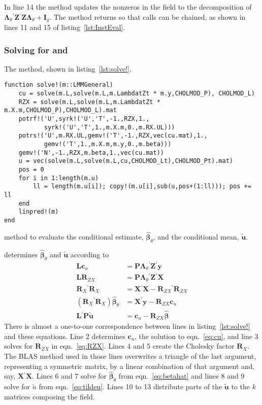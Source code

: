 \documentclass{jss}
\newcommand{\bLt}{\ensuremath{\bm\Lambda_\theta}}
\newcommand{\trans}{\ensuremath{^\prime}}
\begin{document}
In line 14 the  method updates the nonzeros in the
 field to the decomposition of $\bLt\trans\bm Z\trans\bm
Z\bLt+\bm I_q$.  The method returns  so that calls can be
chained, as shown in lines 11 and 15 of listing~\ref{lst:InstEval}.

\subsubsection{Solving for  and }
\label{sec:betasolve}

The  method, shown in listing~\ref{lst:solve!},
\begin{listing}[tbp]
  \begin{verbatim}
function solve!(m::LMMGeneral)
    cu = solve(m.L,solve(m.L,m.LambdatZt * m.y,CHOLMOD_P), CHOLMOD_L)
    RZX = solve(m.L,solve(m.L,m.LambdatZt * m.X.m,CHOLMOD_P),CHOLMOD_L).mat
    potrf!('U',syrk!('U','T',-1.,RZX,1.,
           syrk!('U','T',1.,m.X.m,0.,m.RX.UL)))
    potrs!('U',m.RX.UL,gemv!('T',-1.,RZX,vec(cu.mat),1.,
           gemv!('T',1.,m.X.m,m.y,0.,m.beta)))
    gemv!('N',-1.,RZX,m.beta,1.,vec(cu.mat))
    u = vec(solve(m.L,solve(m.L,cu,CHOLMOD_Lt),CHOLMOD_Pt).mat)
    pos = 0
    for i in 1:length(m.u)
        ll = length(m.u[i]); copy!(m.u[i],sub(u,pos+(1:ll))); pos += ll
    end
    linpred!(m)
end
  \end{verbatim}
  \caption{ method to evaluate the conditional estimate,
    $\widehat{\bm\beta}_\theta$, and the conditional mean, $\tilde{\bm
      u}$.}
  \label{lst:solve!}
\end{listing}
determines $\widehat{\bm\beta}_\theta$ and $\tilde{\bm u}$ according
to
\begin{align}
    \bm L\bm c_u&=\bm P\bLt\trans\bm Z\trans\bm y\label{eq:cu}\\
    \bm L\bm R_{ZX}&=\bm P\bLt\trans\bm Z\trans\bm X\label{eq:RZX}\\
    \bm R_X\trans\bm R_X&=\bm X\trans\bm X-\bm R_{ZX}\trans\bm R_{ZX}\label{eq:RX}\\
    \left(\bm R_X\trans\bm R_X\right)\widehat{\bm\beta}_\theta&=
      \bm X\trans\bm y-\bm R_{ZX}\bm c_u\label{eq:betahat}\\
    \bm L\trans\bm P\tilde{\bm u}&=\bm c_u-\bm R_{ZX}\widehat{\bm\beta}\label{eq:tildeu}
\end{align}
There is almost a one-to-one correspondence between lines in
listing~\ref{lst:solve!} and these equations.  Line 2 determines $\bm
c_u$, the solution to eqn.~\ref{eq:cu}, and line 3 solves for $\bm R_{ZX}$ in
eqn.~\ref{eq:RZX}.  Lines 4 and 5 create the Cholesky factor $\bm
R_X$.  The BLAS method  used in those lines overwrites a
triangle of the last argument, representing a symmetric matrix, by a
linear combination of that argument and, say, $\bm X\trans\bm X$.
Lines 6 and 7 solve for $\widehat{\bm\beta}_\theta$ from
eqn.~\ref{eq:betahat} and lines 8 and 9 solve for $\tilde{u}$ from
eqn.~\ref{eq:tildeu}.  Lines 10 to 13 distribute parts of the
$\tilde{\bm u}$ to the $k$ matrices composing the  field.
\end{document}
